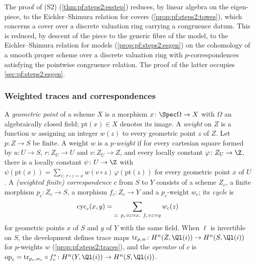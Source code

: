 The proof of (S2) (\cref{thm:pf:steps2:esstep}) reduces, by linear algebra on the eigen-piece, to the
Eichler--Shimura relation for covers (\cref{prop:pf:steps2:towes}), which concerns a cover over a
discrete valuation ring carrying a congruence datum. This is reduced, by descent of the piece to the
generic fibre of the model, to the Eichler--Shimura relation for models
(\cref{prop:pf:steps2:esgen}) on the cohomology of a smooth proper scheme over a discrete valuation
ring with $p$-correspondences satisfying the pointwise congruence relation. The proof of the latter
occupies \cref{sec:pf:steps2:esgen}.

\subsubsection{Weighted traces and correspondences}

\begin{definition}\label{def:pf:steps2:weights}
A \emph{geometric point} of a scheme $X$ is a morphism $x\colon\Spec\Omega\to X$ with $\Omega$ an
algebraically closed field; $\mathrm{pt}(x)\in X$ denotes its image. A \emph{weight} on $Z$ is a
function $w$ assigning an integer $w(z)$ to every geometric point $z$ of $Z$. Let $p\colon Z\to S$ be
finite. A weight $w$ is a \emph{$p$-weight} if for every cartesian square formed by $u\colon U\to S$,
$r\colon Z_U\to U$ and $v\colon Z_U\to Z$, and every locally constant $\varphi\colon Z_U\to\Z$, there is
a locally constant $\psi\colon U\to\Z$ with $\psi(\mathrm{pt}(x))=\sum_{z:\,r\circ z=x}w(v\circ z)\,
\varphi(\mathrm{pt}(z))$ for every geometric point $x$ of $U$. A \emph{(weighted finite)
correspondence} $c$ from $S$ to $Y$ consists of a scheme $Z_c$, a finite morphism $p_c\colon Z_c\to
S$, a morphism $f_c\colon Z_c\to Y$ and a $p_c$-weight $w_c$; its \emph{cycle} is
\[
  \stepsiicyc_c(x,y)=\sum_{z:\ p_c\circ z=x,\ f_c\circ z=y}w_c(z)
\]
for geometric points $x$ of $S$ and $y$ of $Y$ with the same field. When $\ell$ is invertible on
$S$, the development defines trace maps $\stepsiitr_{p,w}\colon H^n(Z,\Ql(i))\to H^n(S,\Ql(i))$ for
$p$-weights $w$ (\cref{prop:pf:steps2:traces}), and the \emph{operator} of $c$ is
$\stepsiiop_c=\stepsiitr_{p_c,w_c}\circ f_c^\ast\colon H^n(Y,\Ql(i))\to H^n(S,\Ql(i))$.
\end{definition}

